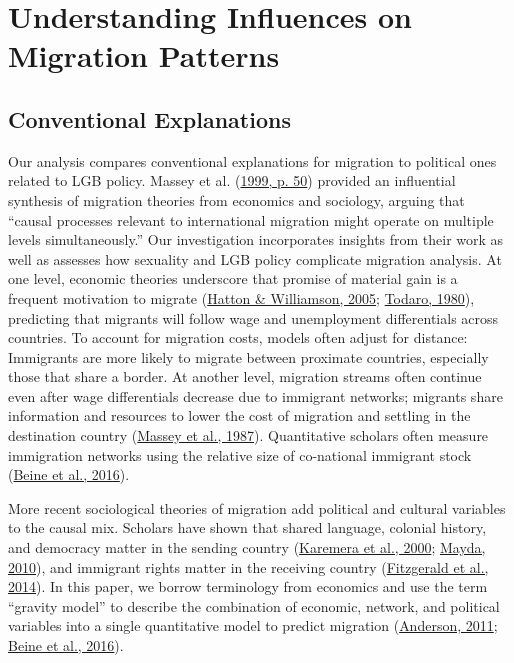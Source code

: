 \documentclass[
  11pt,
]{article}
\begin{document}
\hypertarget{understanding-influences-on-migration-patterns}{%
\section{Understanding Influences on Migration Patterns}\label{understanding-influences-on-migration-patterns}}

\hypertarget{conventional-explanations}{%
\subsection{Conventional Explanations}\label{conventional-explanations}}

Our analysis compares conventional explanations for migration to political ones related to LGB policy. Massey et al. (\protect\hyperlink{ref-massey_1999}{1999, p. 50}) provided an influential synthesis of migration theories from economics and sociology, arguing that ``causal processes relevant to international migration might operate on multiple levels simultaneously.'' Our investigation incorporates insights from their work as well as assesses how sexuality and LGB policy complicate migration analysis. At one level, economic theories underscore that promise of material gain is a frequent motivation to migrate (\protect\hyperlink{ref-hatton_2005a}{Hatton \& Williamson, 2005}; \protect\hyperlink{ref-todaro_1980}{Todaro, 1980}), predicting that migrants will follow wage and unemployment differentials across countries. To account for migration costs, models often adjust for distance: Immigrants are more likely to migrate between proximate countries, especially those that share a border. At another level, migration streams often continue even after wage differentials decrease due to immigrant networks; migrants share information and resources to lower the cost of migration and settling in the destination country (\protect\hyperlink{ref-massey_1987}{Massey et al., 1987}). Quantitative scholars often measure immigration networks using the relative size of co-national immigrant stock (\protect\hyperlink{ref-beine_2016}{Beine et al., 2016}).

More recent sociological theories of migration add political and cultural variables to the causal mix. Scholars have shown that shared language, colonial history, and democracy matter in the sending country (\protect\hyperlink{ref-karemera_2000}{Karemera et al., 2000}; \protect\hyperlink{ref-mayda_2010}{Mayda, 2010}), and immigrant rights matter in the receiving country (\protect\hyperlink{ref-fitzgerald_2014}{Fitzgerald et al., 2014}). In this paper, we borrow terminology from economics and use the term ``gravity model'' to describe the combination of economic, network, and political variables into a single quantitative model to predict migration (\protect\hyperlink{ref-anderson_2011}{Anderson, 2011}; \protect\hyperlink{ref-beine_2016}{Beine et al., 2016}).
\end{document}
